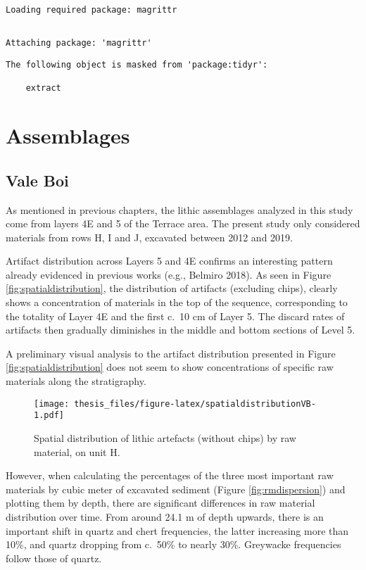 \documentclass[12pt,twoside]{reedthesis}
\begin{document}
\begin{verbatim}
Loading required package: magrittr
\end{verbatim}
\begin{verbatim}

Attaching package: 'magrittr'
\end{verbatim}
\begin{verbatim}
The following object is masked from 'package:tidyr':

    extract
\end{verbatim}
\hypertarget{assemblages}{%
\section{Assemblages}\label{assemblages}}

\hypertarget{vale-boi-2}{%
\subsection{Vale Boi}\label{vale-boi-2}}

As mentioned in previous chapters, the lithic assemblages analyzed in this study come from layers 4E and 5 of the Terrace area. The present study only considered materials from rows H, I and J, excavated between 2012 and 2019.

Artifact distribution across Layers 5 and 4E confirms an interesting pattern already evidenced in previous works (e.g., Belmiro 2018). As seen in Figure \ref{fig:spatialdistribution}, the distribution of artifacts (excluding chips), clearly shows a concentration of materials in the top of the sequence, corresponding to the totality of Layer 4E and the first c.~10 cm of Layer 5. The discard rates of artifacts then gradually diminishes in the middle and bottom sections of Level 5.

A preliminary visual analysis to the artifact distribution presented in Figure \ref{fig:spatialdistribution} does not seem to show concentrations of specific raw materials along the stratigraphy.
\begin{figure}
\centering
\texttt{[image: thesis\_files/figure-latex/spatialdistributionVB-1.pdf]}
\caption{\label{fig:spatialdistributionVB}Spatial distribution of lithic artefacts (without chips) by raw material, on unit H.}
\end{figure}
However, when calculating the percentages of the three most important raw materials by cubic meter of excavated sediment (Figure \ref{fig:rmdispersion}) and plotting them by depth, there are significant differences in raw material distribution over time. From around 24.1 m of depth upwards, there is an important shift in quartz and chert frequencies, the latter increasing more than 10\%, and quartz dropping from c.~50\% to nearly 30\%. Greywacke frequencies follow those of quartz.
\end{document}
